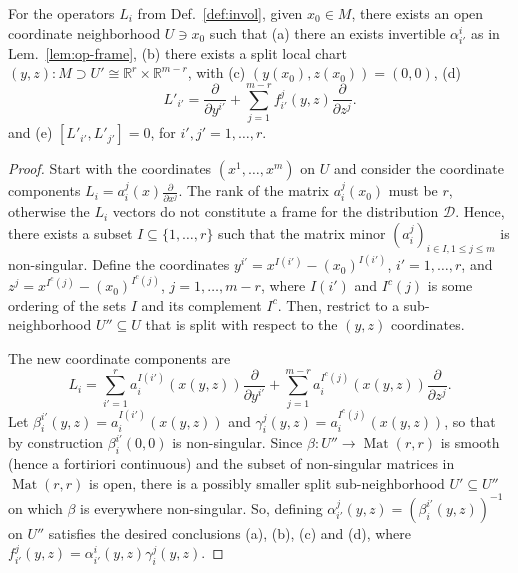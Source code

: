 \begin{lemma} \label{lem:loc-init-split}
For the operators $L_i$ from Def.~\ref{def:invol}, given $x_0 \in M$, there exists
an open coordinate neighborhood $U\ni x_0$ such that (a) there an exists invertible
$\alpha_{i'}^i$ as in Lem.~\ref{lem:op-frame}, (b) there exists a split local
chart $(y,z)\colon M \supset U' \cong \mathbb{R}^r \times \mathbb{R}^{m-r}$, with
(c) $(y(x_0),z(x_0)) = (0,0)$, (d)
\[
  L'_{i'} = \frac{\partial}{\partial y^{i'}} + \sum_{j=1}^{m-r} f_{i'}^j(y,z) \frac{\partial}{\partial z^j} .
\]
and (e) $[L'_{i'}, L'_{j'}] = 0$, for $i',j'=1,\ldots,r$.
\end{lemma}
\begin{proof}
Start with the coordinates $(x^1,\ldots,x^m)$ on $U$ and consider the coordinate
components $L_i = a_i^j(x) \frac{\partial}{\partial x^j}$. The rank of the
matrix $a_i^j(x_0)$ must be $r$, otherwise the $L_i$ vectors do not constitute a
frame for the distribution $\mathcal{D}$. Hence, there exists a subset $I
\subseteq \{1,\ldots,r\}$ such that the matrix minor $(a_i^j)_{i\in I, 1\le j\le
m}$ is non-singular. Define the coordinates $y^{i'} = x^{I(i')} -
(x_0)^{I(i')}$, $i'=1,\ldots,r$, and $z^{j} = x^{I^c(j)} - (x_0)^{I^c(j)}$,
$j=1,\ldots,m-r$, where $I(i')$ and $I^c(j)$ is some ordering of the sets $I$
and its complement $I^c$. Then, restrict to a sub-neighborhood $U'' \subseteq U$
that is split with respect to the $(y,z)$ coordinates.

The new coordinate components are
\[
  L_{i} = \sum_{i'=1}^r a_{i}^{I(i')}(x(y,z)) \frac{\partial}{\partial y^{i'}}
    + \sum_{j=1}^{m-r} a_{i}^{I^c(j)}(x(y,z)) \frac{\partial}{\partial z^j} .
\]
Let $\beta_{i}^{i'}(y,z) = a_{i}^{I(i')}(x(y,z))$ and $\gamma_{i}^{j}(y,z) =
a_{i}^{I^c(j)}(x(y,z))$, so that by construction $\beta_{i}^{i'}(0,0)$ is
non-singular. Since $\beta \colon U'' \to \operatorname{Mat}(r,r)$ is smooth
(hence a fortiriori continuous) and the subset of non-singular matrices in
$\operatorname{Mat}(r,r)$ is open, there is a possibly smaller split
sub-neighborhood $U' \subseteq U''$ on which $\beta$ is everywhere non-singular.
So, defining $\alpha_{i'}^j(y,z) = (\beta_{i}^{i'}(y,z))^{-1}$ on $U''$
satisfies the desired conclusions (a), (b), (c) and (d), where $f_{i'}^j(y,z) =
\alpha_{i'}^i(y,z) \gamma_{i}^j(y,z)$.


\end{proof}
